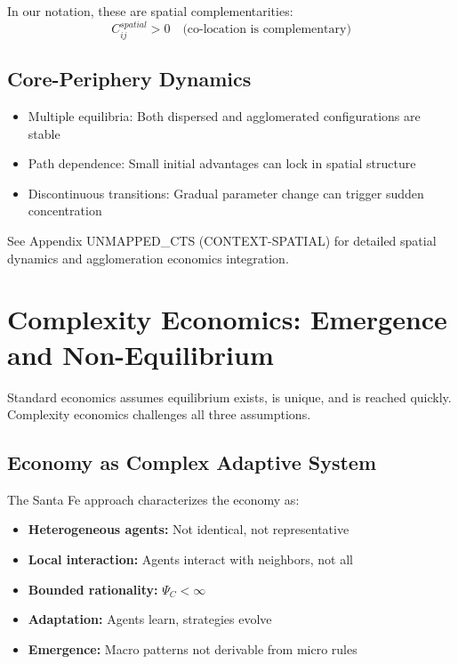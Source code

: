 In our notation, these are spatial complementarities:
\begin{equation}
C_{ij}^{spatial} > 0 \quad \text{(co-location is complementary)}
\label{eq:spatial-complementarity}
\end{equation}

\subsection{Core-Periphery Dynamics}

\begin{itemize}[nosep]
  \item Multiple equilibria: Both dispersed and agglomerated configurations are stable
  \item Path dependence: Small initial advantages can lock in spatial structure
  \item Discontinuous transitions: Gradual parameter change can trigger sudden concentration
\end{itemize}

\begin{cross-reference}
See Appendix UNMAPPED_CTS (CONTEXT-SPATIAL) for detailed spatial dynamics
and agglomeration economics integration.
\end{cross-reference}



\section{Complexity Economics: Emergence and Non-Equilibrium}
\label{sec:context-complexity}


Standard economics assumes equilibrium exists, is unique, and is reached quickly.
Complexity economics \citep{arthur2015} challenges all three assumptions.

\subsection{Economy as Complex Adaptive System}

The Santa Fe approach \citep{arthur1997} characterizes the economy as:
\begin{itemize}[nosep]
  \item \textbf{Heterogeneous agents:} Not identical, not representative
  \item \textbf{Local interaction:} Agents interact with neighbors, not all
  \item \textbf{Bounded rationality:} $\Psi_C < \infty$
  \item \textbf{Adaptation:} Agents learn, strategies evolve
  \item \textbf{Emergence:} Macro patterns not derivable from micro rules
\end{itemize}

